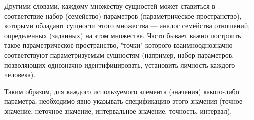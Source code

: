 Другими словами, каждому множеству сущностей может ставиться в соответствие набор (семейство) параметров (параметрическое пространство), которыми обладают сущности этого множества --- аналог семейства отношений, определенных (заданных) на этом множестве. Часто бывает важно построить такое параметрическое пространство, "точки"{} которого взаимнооднозначно соответствуют параметризуемым сущностям (например, набор параметров, позволяющих однозначно идентифицировать, установить личность каждого человека). 
		
Таким образом, для каждого используемого элемента (значения) какого-либо параметра, необходимо явно указывать спецификацию этого значения (точное значение, неточное значение, интервальное значение, точность, интервал).

\begin{comment}
	

\begin{SCn}
\scnheader{область определения параметра*}
\scnidtf{множество всех тех и только тех сущностей, которые являются компонентами значений заданного параметра*}
\scnidtf{множество всех тех и только тех сущностей, которые обладают заданным параметром*}
\scnrelto{включение}{объединение*}

\bigskip
\scnheader{измеряемый параметр}
\scnidtf{количественный параметр}
\scnidtf{семейство измеряемых величин}
\scnidtf{семейство классов эквивалентности, каждому из которых может быть поставлено в соответствие числовое значение}
\end{SCn}

Каждый \textbf{\textit{измеряемый параметр}} представляет собой \textit{параметр}, значение (элемент, экземпляр) которого трактуется как \textit{величина}, которой можно поставить в соответствие ее числовое значение на основании выбранной единицы измерения и/или точки отсчета (нулевой отметки выбранной шкалы).

\begin{SCn}
\scnsuperset{параметр, измеряемый по шкале}
	
\scnheader{неизмеряемый параметр}
\scnidtf{качественный параметр}
	
\scnheader{ориентированный параметр}
\scnidtf{упорядоченный параметр}
\scnsuperset{параметр, измеряемый по шкале}
\scnidtf{параметр, на значениях которого может быть задано некоторое отношение порядка, семантика которого уточняется в зависимости от семантики параметра}
	

\scnheader{величина}
\scnidtf{значение количественного параметра}
\scnidtf{значение измеряемого параметра}
\scnidtf{класс сущностей, имеющих одинаковое значение соответствующего параметра}
\begin{scnrelfromlist}{включение}
	\scnitem{точная величина}
	\scnitem{неточная величина}
	\scnitem{интервальная величина}
\end{scnrelfromlist}
\end{SCn}


\end{comment}
